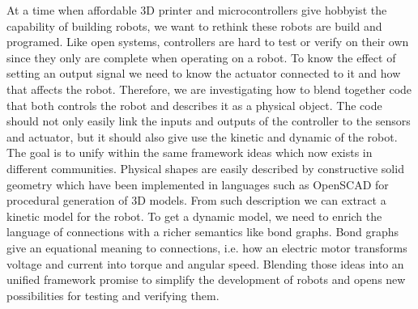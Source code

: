 At a time when affordable 3D printer and microcontrollers give hobbyist the capability of building robots, we want to rethink these robots are build and programed.
Like open systems, controllers are hard to test or verify on their own since they only are complete when operating on a robot.
To know the effect of setting an output signal we need to know the actuator connected to it and how that affects the robot.
Therefore, we are investigating how to blend together code that both controls the robot and describes it as a physical object.
The code should not only easily link the inputs and outputs of the controller to the sensors and actuator, but it should also give use the kinetic and dynamic of the robot.
The goal is to unify within the same framework ideas which now exists in different communities.
Physical shapes are easily described by constructive solid geometry which have been implemented in languages such as OpenSCAD for procedural generation of 3D models.
From such description we can extract a kinetic model for the robot.
To get a dynamic model, we need to enrich the language of connections with a richer semantics like bond graphs.
Bond graphs give an equational meaning to connections, i.e. how an electric motor transforms voltage and current into torque and angular speed.
Blending those ideas into an unified framework promise to simplify the development of robots and opens new possibilities for testing and verifying them.
